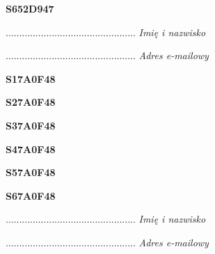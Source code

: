 \begin{turn}{90}\huge \textbf{S652D947}\end{turn}

\begin{turn}{90}\begin{minipage}{\linewidth} \vspace{20mm} ................................................  \textit{Imię i nazwisko}\end{minipage}\end{turn}

\begin{turn}{90}\begin{minipage}{\linewidth} \vspace{20mm} ................................................  \textit{Adres e-mailowy}\end{minipage}\end{turn}

\begin{turn}{90}\huge \textbf{S17A0F48}\end{turn}

\begin{turn}{90}\huge \textbf{S27A0F48}\end{turn}

\begin{turn}{90}\huge \textbf{S37A0F48}\end{turn}

\begin{turn}{90}\huge \textbf{S47A0F48}\end{turn}

\begin{turn}{90}\huge \textbf{S57A0F48}\end{turn}

\begin{turn}{90}\huge \textbf{S67A0F48}\end{turn}

\begin{turn}{90}\begin{minipage}{\linewidth} \vspace{20mm} ................................................  \textit{Imię i nazwisko}\end{minipage}\end{turn}

\begin{turn}{90}\begin{minipage}{\linewidth} \vspace{20mm} ................................................  \textit{Adres e-mailowy}\end{minipage}\end{turn}

